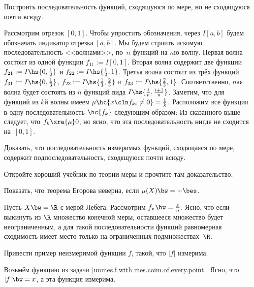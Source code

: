 \documentclass[a4paper,draft]{article}
\begin{document}
\begin{problem}
  Построить последовательность функций, сходящуюся по мере, но не сходящуюся почти всюду.
\end{problem}
\begin{solution}
  Рассмотрим отрезок $[0,1]$. Чтобы упростить обозначения, через $I[a,b]$ будем обозначать
  индикатор отрезка $[a,b]$. Мы будем строить искомую последовательность <<волнами>>, по~$n$
  функций на $n$\д ю волну. Первая волна состоит из одной функции $f_{11} := I[0,1]$. Вторая
  волна содержит две функции $f_{21} := I\hs{0,\frac12}$ и $f_{22} := I\hs{\frac12,1}$.
  Третья волна состоит из трёх функций $f_{31} := I\hs{0,\frac13}$, $f_{23} := I\hs{\frac13,\frac23}$
  и $f_{33} := I\hs{\frac23,1}$. Соответственно, $n$\д ая волна будет состоять из $n$ функций
  вида $I\hs{\frac in,\frac{i+1}n}$. Заметим, что для функций из $k$\д й волны имеем
  $\mu\hc{x\cln f_{ki} \neq 0} = \frac1k$. Расположим все функции в одну последовательность
  $\hc{f_k}$ следующим образом:
  Из сказанного выше следует, что $f_k \xra{\mu} 0$, но ясно, что эта последовательность нигде не сходится
  на~$[0,1]$.
\end{solution}

\begin{problem}
  Доказать, что последовательность измеримых функций, сходящаяся по мере, содержит
  подпоследовательность, сходящуюся почти всюду.
\end{problem}
\begin{solution}
  Откройте хороший учебник по теории меры и прочтите там доказательство.
\end{solution}

\begin{problem}
  Показать, что теорема Егорова неверна, если $\mu(X) \bw= +\bes$.
\end{problem}
\begin{solution}
  Пусть $X \bw= \R$ с мерой Лебега. Рассмотрим $f_n \bw= \frac xn$. Ясно, что
  если выкинуть из $\R$ множество конечной меры, оставшееся множество будет неограниченным,
  а для такой последовательности функций равномерная сходимость имеет место только
  на ограниченных подмножествах~$\R$.
\end{solution}

\begin{problem}
  Привести пример неизмеримой функции $f$, такой, что $|f|$ измерима.
\end{problem}
\begin{solution}
  Возьмём функцию из задачи \ref{unmes.f.with.mes.coim.of.every.point}. Ясно, что
  $|f| \bw= x$, а эта функция измерима.
\end{solution}
\end{document}
